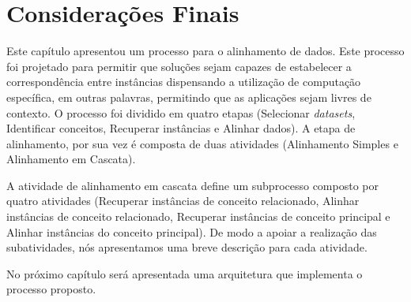 \section{Considerações Finais}
Este capítulo apresentou um processo para o alinhamento de dados. Este processo foi projetado para permitir que soluções sejam capazes de estabelecer a correspondência entre instâncias dispensando a utilização de computação específica, em outras palavras, permitindo que as aplicações sejam livres de contexto. O processo foi dividido em quatro etapas (Selecionar \textit{datasets}, Identificar conceitos, Recuperar instâncias e Alinhar dados).  A etapa de alinhamento, por sua vez é composta de duas atividades (Alinhamento Simples e Alinhamento em Cascata).

A atividade de alinhamento em cascata define um subprocesso composto por quatro atividades (Recuperar instâncias de conceito relacionado, Alinhar instâncias de conceito relacionado, Recuperar instâncias de conceito principal e Alinhar instâncias do conceito principal). De modo a apoiar a realização das subatividades, nós apresentamos uma breve descrição para cada atividade.

No próximo capítulo será apresentada uma arquitetura  que implementa o processo proposto.

